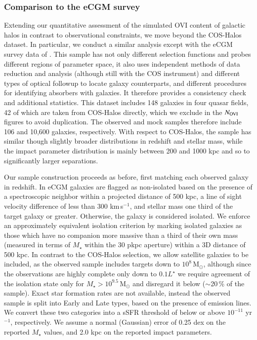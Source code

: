 \documentclass[useAMS,usenatbib]{mnras}
\newcommand{\msun}{\,M$_{\odot}$\xspace}
\newcommand{\ovi}{OVI\xspace}
\begin{document}
\subsubsection{Comparison to the eCGM survey}

Extending our quantitative assessment of the simulated \ovi content of galactic halos in contrast to observational constraints, we move beyond the COS-Halos dataset. In particular, we conduct a similar analysis except with the eCGM survey data of \cite{johnson15a}. This sample has not only different selection functions and probes different regions of parameter space, it also uses independent methods of data reduction and analysis (although still with the COS instrument) and different types of optical followup to locate galaxy counterparts, and different procedures for identifying absorbers with galaxies. It therefore provides a consistency check and additional statistics. This dataset includes 148 galaxies in four quasar fields, 42 of which are taken from COS-Halos directly, which we exclude in the $N_{\rm OVI}$ figures to avoid duplication. The observed and mock samples therefore include 106 and 10,600 galaxies, respectively. With respect to COS-Halos, the sample has similar though slightly broader distributions in redshift and stellar mass, while the impact parameter distribution is mainly between 200 and 1000 kpc and so to significantly larger separations. 

Our sample construction proceeds as before, first matching each observed galaxy in redshift. In eCGM galaxies are flagged as non-isolated based on the presence of a spectroscopic neighbor within a projected distance of 500 kpc, a line of sight velocity difference of less than 300 km\,s$^{-1}$, and stellar mass one third of the target galaxy or greater. Otherwise, the galaxy is considered isolated. We enforce an approximately equivalent isolation criterion by marking isolated galaxies as those which have no companion more massive than a third of their own mass (measured in terms of $M_\star$ within the 30 pkpc aperture) within a 3D distance of 500 kpc. In contrast to the COS-Halos selection, we allow satellite galaxies to be included, as the observed sample includes targets down to $10^{8}$\msun, although since the observations are highly complete only down to $0.1 L^\star$ we require agreement of the isolation state only for $M_\star > 10^{9.5}$\msun and disregard it below ($\sim$20\,\% of the sample). Exact star formation rates are not available, instead the observed sample is split into Early and Late types, based on the presence of emission lines. We convert these two categories into a sSFR threshold of below or above $10^{-11}$ yr$^{-1}$, respectively. We assume a normal (Gaussian) error of 0.25 dex on the reported $M_\star$ values, and 2.0 kpc on the reported impact parameters. 
\end{document}
